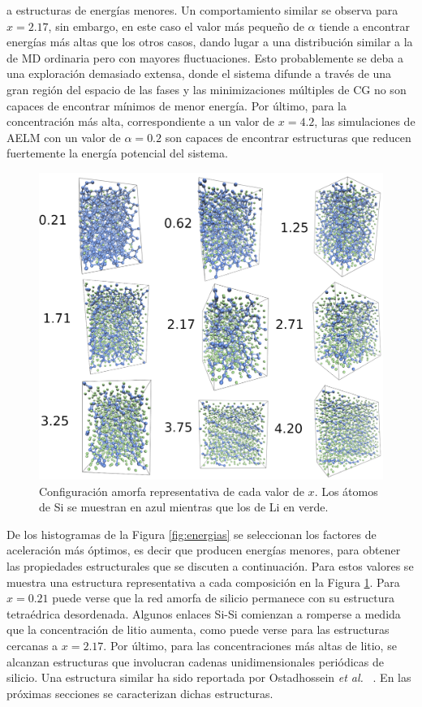 a estructuras de energías menores. Un comportamiento similar se observa para 
$x = 2.17$, sin embargo, en este caso el valor más pequeño de $\alpha$ tiende a 
encontrar energías más altas que los otros casos, dando lugar a una distribución
similar a la de MD ordinaria pero con mayores fluctuaciones. Esto probablemente 
se deba a una exploración demasiado extensa, donde el sistema difunde a través
de una gran región del espacio de las fases y las minimizaciones múltiples de 
CG no son capaces de encontrar mínimos de menor energía. Por último, para la 
concentración más alta, correspondiente a un valor de $x = 4.2$, las simulaciones 
de AELM con un valor de $\alpha = 0.2$ son capaces de encontrar estructuras que 
reducen fuertemente la energía potencial del sistema. 

\begin{figure}[t]
    \centering
    \includegraphics[width=\textwidth]{Silicio/caracterizacion/resultados/introduccion/amorfas.png}
    \caption{Configuración amorfa representativa de cada valor de $x$. Los átomos
    de Si se muestran en azul mientras que los de Li en verde.}
    \label{fig:amorfas}
\end{figure}
De los histogramas de la Figura \ref{fig:energias} se seleccionan los factores 
de aceleración más óptimos, es decir que producen energías menores, para obtener
las propiedades estructurales que se discuten a continuación. Para estos valores
se muestra una estructura representativa a cada composición en la Figura 
\ref{fig:amorfas}. Para $x = 0.21$ puede verse que la red amorfa de silicio
permanece con su estructura tetraédrica desordenada. Algunos enlaces Si-Si 
comienzan a romperse a medida que la concentración de litio aumenta, como puede
verse para las estructuras cercanas a $x = 2.17$. Por último, para las 
concentraciones más altas de litio, se alcanzan estructuras que involucran 
cadenas unidimensionales periódicas de silicio. Una estructura similar ha sido 
reportada por Ostadhossein \textit{et al.} ~\cite{ostadhossein2015}. En las 
próximas secciones se caracterizan dichas estructuras.
